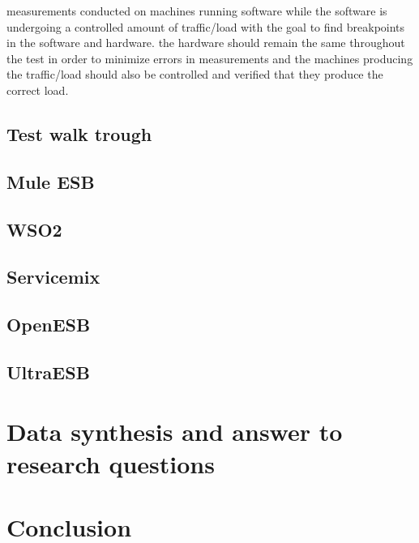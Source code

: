 \documentclass{llncs}
\begin{document}
measurements conducted on machines running software while the software is undergoing a controlled amount of traffic/load with the goal to find breakpoints in the software and hardware. the hardware should remain the same throughout the test in order to minimize errors in measurements and the machines producing the traffic/load should also be controlled and verified that they produce the correct load. 
\subsection{Test walk trough}
	\subsection{Mule ESB}
	\subsection{WSO2}
	\subsection{Servicemix}
	\subsection{OpenESB}
	\subsection{UltraESB}

\section{Data synthesis and answer to research questions}
\section{Conclusion}



\end{document}
